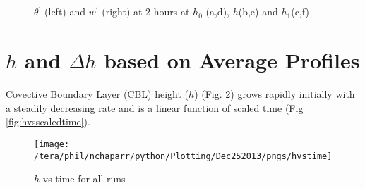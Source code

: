 \begin{figure}[htbp]
\caption{$\theta^{'}$ (left) and $w^{'}$ (right) at 2 hours at $h_{0}$ (a,d), $h$(b,e) and $h_{1}$(c,f)}
\begin{minipage}[b]{0.5\linewidth} 
        
        \\
        \\ 
 \end{minipage}             
\quad
\begin{minipage}[b]{0.5\linewidth}
        \\
       
       \\
        
\end{minipage}
        
        \label{fig:conts1}
\end{figure}

\clearpage

\section{$h$ and  $\Delta h$ based on Average Profiles}
\label{sec:hdeltahavprofs}     
\FloatBarrier

Covective Boundary Layer (CBL) height ($h$) (Fig. \ref{fig:hvstime}) grows rapidly initially with a steadily decreasing rate
and is a linear function of scaled time (Fig \ref{fig:hvsscaledtime}).\\
  
\begin{figure}[htbp]
    \centering
    \texttt{[image: /tera/phil/nchaparr/python/Plotting/Dec252013/pngs/hvstime]}
    \caption{$h$ vs time for all runs}
    \label{fig:hvstime}   %
\end{figure}



